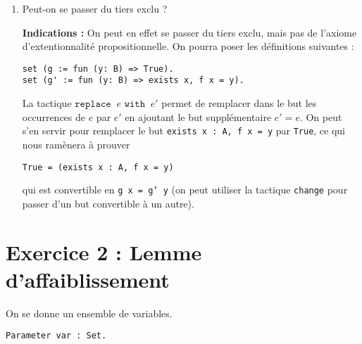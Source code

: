 \documentclass{article}
\begin{document}
\begin{enumerate}
\item Peut-on se passer du tiers exclu ?

\textbf{Indications :} On peut en effet se passer du tiers exclu, mais pas de l'axiome d'extentionnalité propositionnelle.
On pourra poser les définitions suivantes :
\begin{verbatim}
set (g := fun (y: B) => True).
set (g' := fun (y: B) => exists x, f x = y).
\end{verbatim}

La tactique \(\texttt{replace }~e\texttt{ with }~e'\) permet de remplacer dans le but les occurrences de \(e\) par \(e'\) en ajoutant le but supplémentaire \(e' = e\). On peut s'en servir pour remplacer le but \texttt{exists x : A, f x = y} par \texttt{True}, ce qui nous ramènera à prouver

\texttt{True = (exists x : A, f x = y)}

qui est convertible en \texttt{g x = g' y} (on peut utiliser la tactique \texttt{change} pour passer d'un but convertible à un autre).
\end{enumerate}

\section*{Exercice 2 : Lemme d'affaiblissement}

On se donne un ensemble de variables.

\begin{verbatim}
Parameter var : Set.
\end{verbatim}
\end{document}
